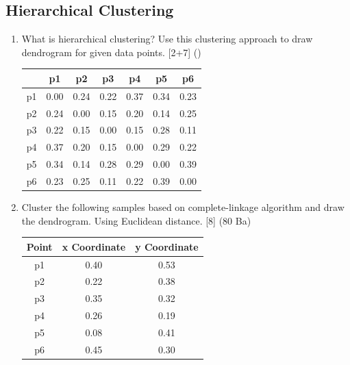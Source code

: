 \documentclass[12pt]{article}
\begin{document}
  \subsection{Hierarchical Clustering}
    \begin{enumerate}[topsep=0pt, noitemsep]
      \item What is hierarchical clustering? Use this clustering approach to draw dendrogram for given data points. \hfill [2+7] ()\\
        \small
        \begin{tabular}{|c|c|c|c|c|c|c|}
          \hline
           & p1 & p2 & p3 & p4 & p5 & p6 \\ \hline
          p1 & 0.00 & 0.24 & 0.22 & 0.37 & 0.34 & 0.23 \\ \hline
          p2 & 0.24 & 0.00 & 0.15 & 0.20 & 0.14 & 0.25 \\ \hline
          p3 & 0.22 & 0.15 & 0.00 & 0.15 & 0.28 & 0.11 \\ \hline
          p4 & 0.37 & 0.20 & 0.15 & 0.00 & 0.29 & 0.22 \\ \hline
          p5 & 0.34 & 0.14 & 0.28 & 0.29 & 0.00 & 0.39 \\ \hline
          p6 & 0.23 & 0.25 & 0.11 & 0.22 & 0.39 & 0.00 \\ \hline
        \end{tabular}
        \normalsize

      \item Cluster the following samples based on complete-linkage algorithm and draw the dendrogram. Using Euclidean distance. \hfill [8] (80 Ba)\\
        \small
        \begin{tabular}{|c|c|c|}
          \hline
          Point & x Coordinate & y Coordinate \\ \hline
          p1 & 0.40 & 0.53 \\ \hline
          p2 & 0.22 & 0.38 \\ \hline
          p3 & 0.35 & 0.32 \\ \hline
          p4 & 0.26 & 0.19 \\ \hline
          p5 & 0.08 & 0.41 \\ \hline
          p6 & 0.45 & 0.30 \\ \hline
        \end{tabular}
        \normalsize


\end{enumerate}
\end{document}
